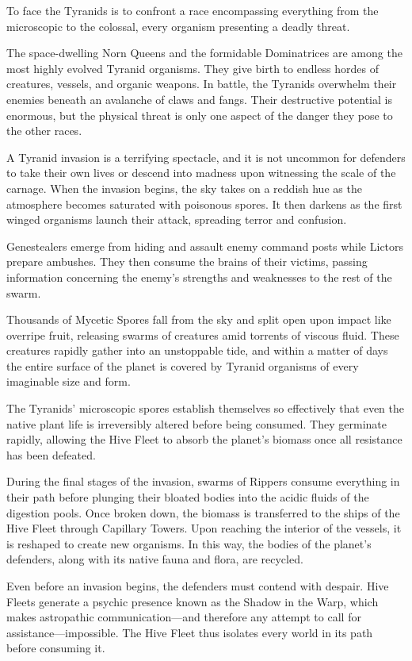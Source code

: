 To face the Tyranids is to confront a race encompassing everything from the microscopic to the colossal, every organism presenting a deadly threat.

The space-dwelling Norn Queens and the formidable Dominatrices are among the most highly evolved Tyranid organisms. They give birth to endless hordes of creatures, vessels, and organic weapons. In battle, the Tyranids overwhelm their enemies beneath an avalanche of claws and fangs. Their destructive potential is enormous, but the physical threat is only one aspect of the danger they pose to the other races.

A Tyranid invasion is a terrifying spectacle, and it is not uncommon for defenders to take their own lives or descend into madness upon witnessing the scale of the carnage. When the invasion begins, the sky takes on a reddish hue as the atmosphere becomes saturated with poisonous spores. It then darkens as the first winged organisms launch their attack, spreading terror and confusion.

Genestealers emerge from hiding and assault enemy command posts while Lictors prepare ambushes. They then consume the brains of their victims, passing information concerning the enemy's strengths and weaknesses to the rest of the swarm.

Thousands of Mycetic Spores fall from the sky and split open upon impact like overripe fruit, releasing swarms of creatures amid torrents of viscous fluid. These creatures rapidly gather into an unstoppable tide, and within a matter of days the entire surface of the planet is covered by Tyranid organisms of every imaginable size and form.

The Tyranids' microscopic spores establish themselves so effectively that even the native plant life is irreversibly altered before being consumed. They germinate rapidly, allowing the Hive Fleet to absorb the planet's biomass once all resistance has been defeated.

During the final stages of the invasion, swarms of Rippers consume everything in their path before plunging their bloated bodies into the acidic fluids of the digestion pools. Once broken down, the biomass is transferred to the ships of the Hive Fleet through Capillary Towers. Upon reaching the interior of the vessels, it is reshaped to create new organisms. In this way, the bodies of the planet's defenders, along with its native fauna and flora, are recycled.

Even before an invasion begins, the defenders must contend with despair. Hive Fleets generate a psychic presence known as the Shadow in the Warp, which makes astropathic communication—and therefore any attempt to call for assistance—impossible. The Hive Fleet thus isolates every world in its path before consuming it.

